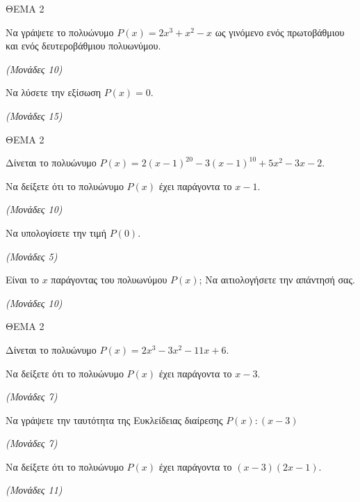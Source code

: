 \documentclass[11pt,a4paper,twoside]{book}
\newcommand{\monades}[1]{\hfill \textit{(Μονάδες #1)}}
\begin{document}
\vspace{4mm}

ΘΕΜΑ 2

\begin{alist}
\item Να γράψετε το πολυώνυμο $P(x) = 2x^{3} + x^{2} - x$ ως γινόμενο ενός πρωτοβάθμιου και ενός δευτεροβάθμιου πολυωνύμου.

\monades{10}

\item Να λύσετε την εξίσωση $P(x) = 0.$

\monades{15}
\end{alist}

\vspace{4mm}

ΘΕΜΑ 2

Δίνεται το πολυώνυμο $P(x) = 2(x - 1)^{20} - 3(x - 1)^{10} + 5x^2 - 3x - 2$.

\begin{alist}
\item Να δείξετε ότι το πολυώνυμο $P(x)$ έχει παράγοντα το $x - 1$.

\monades{10}

\item

\begin{rlist}
\item Να υπολογίσετε την τιμή $P(0)$.

\monades{5}

\item Είναι το $x$ παράγοντας του πολυωνύμου $P(x)$; Να αιτιολογήσετε την απάντησή σας.

\monades{10}
\end{rlist}
\end{alist}

\vspace{4mm}

ΘΕΜΑ 2

Δίνεται το πολυώνυμο $P(x) = 2x^3 - 3x^2 - 11x + 6$.

\begin{alist}
\item

\begin{rlist}
\item Να δείξετε ότι το πολυώνυμο $P(x)$ έχει παράγοντα το $x - 3$.

\monades{7}

\item Να γράψετε την ταυτότητα της Ευκλείδειας διαίρεσης $P(x) : (x - 3)$

\monades{7}

\end{rlist}
\item Να δείξετε ότι το πολυώνυμο $P(x)$ έχει παράγοντα το $(x - 3)(2x - 1)$.

\monades{11}
\end{alist}
\end{document}
